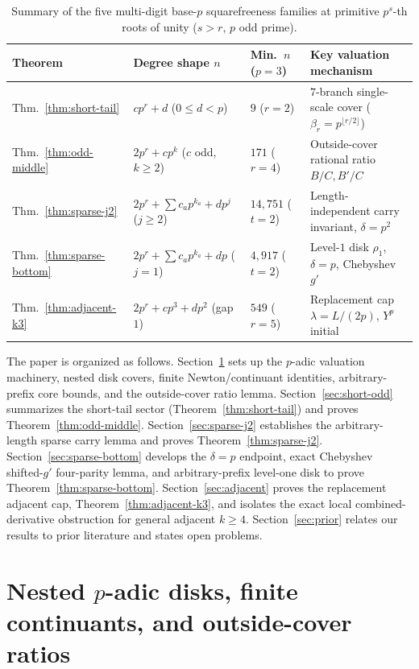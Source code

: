 \documentclass[11pt,reqno]{amsart}
\numberwithin{equation}{section}
\theoremstyle{definition}
\theoremstyle{remark}
\begin{document}
\begin{table}[ht]
\centering
\caption{Summary of the five multi-digit base-$p$ squarefreeness families at primitive $p^s$-th roots of unity ($s>r$, $p$ odd prime).}
\label{tab:families}
\begin{tabular}{llll}
\toprule
Theorem & Degree shape $n$ & Min.\ $n$ ($p=3$) & Key valuation mechanism \\
\midrule
Thm.~\ref{thm:short-tail} & $cp^r + d$ ($0\le d<p$) & $9$ ($r=2$) & $7$-branch single-scale cover ($\beta_r=p^{\lfloor r/2\rfloor}$) \\
Thm.~\ref{thm:odd-middle} & $2p^r + cp^k$ ($c$ odd, $k\ge 2$) & $171$ ($r=4$) & Outside-cover rational ratio $B/C, B'/C$ \\
Thm.~\ref{thm:sparse-j2} & $2p^r+\sum c_a p^{k_a}+dp^j$ ($j\ge 2$) & $14{,}751$ ($t=2$) & Length-independent carry invariant, $\delta=p^2$ \\
Thm.~\ref{thm:sparse-bottom} & $2p^r+\sum c_a p^{k_a}+dp$ ($j=1$) & $4{,}917$ ($t=2$) & Level-$1$ disk $\rho_1$, $\delta=p$, Chebyshev $g'$ \\
Thm.~\ref{thm:adjacent-k3} & $2p^r + cp^3 + dp^2$ (gap $1$) & $549$ ($r=5$) & Replacement cap $\lambda=L/(2p)$, $Y^p$ initial \\
\bottomrule
\end{tabular}
\end{table}

The paper is organized as follows. Section~\ref{sec:framework} sets up the $p$-adic valuation machinery, nested disk covers, finite Newton/continuant identities, arbitrary-prefix core bounds, and the outside-cover ratio lemma. Section~\ref{sec:short-odd} summarizes the short-tail sector (Theorem~\ref{thm:short-tail}) and proves Theorem~\ref{thm:odd-middle}. Section~\ref{sec:sparse-j2} establishes the arbitrary-length sparse carry lemma and proves Theorem~\ref{thm:sparse-j2}. Section~\ref{sec:sparse-bottom} develops the $\delta=p$ endpoint, exact Chebyshev shifted-$g'$ four-parity lemma, and arbitrary-prefix level-one disk to prove Theorem~\ref{thm:sparse-bottom}. Section~\ref{sec:adjacent} proves the replacement adjacent cap, Theorem~\ref{thm:adjacent-k3}, and isolates the exact local combined-derivative obstruction for general adjacent $k\ge 4$. Section~\ref{sec:prior} relates our results to prior literature and states open problems.

\section{Nested $p$-adic disks, finite continuants, and outside-cover ratios}
\label{sec:framework}
\end{document}
